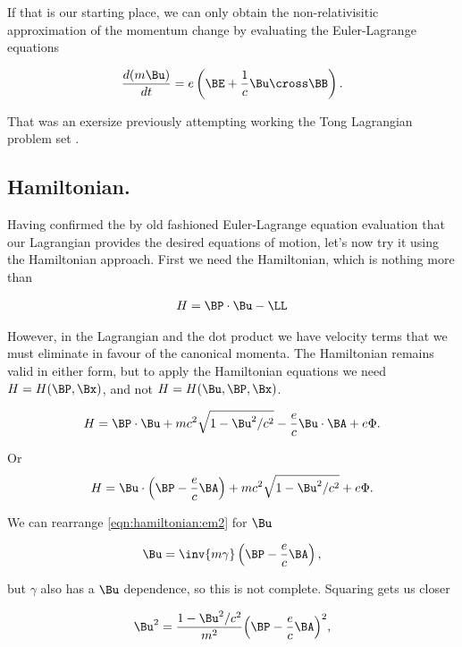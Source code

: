 If that is our starting place, we can only obtain the non-relativisitic approximation of the momentum change by evaluating the Euler-Lagrange equations

\begin{align}\label{eqn:hamiltonian:em5a}
\frac{d (m \Bu)}{dt} = e \left( \BE + \frac{1}{c} \Bu \cross \BB \right).
\end{align}

That was an exersize previously attempting working the Tong Lagrangian problem set \cite{TongMf1}.

\subsection{Hamiltonian.}

Having confirmed the by old fashioned Euler-Lagrange equation evaluation that our Lagrangian provides the desired equations of motion, let's now try it using the Hamiltonian approach.  First we need the Hamiltonian, which is nothing more than

\begin{align}\label{eqn:hamiltonian:em10}
H = \BP \cdot \Bu - \LL
\end{align}

However, in the Lagrangian and the dot product we have velocity terms that we must eliminate in favour of the canonical momenta.  The Hamiltonian remains valid in either form, but to apply the Hamiltonian equations we need $H = H(\BP, \Bx)$, and not $H = H(\Bu, \BP, \Bx)$.

\begin{align}\label{eqn:hamiltonian:em11}
H = \BP \cdot \Bu + m c^2 \sqrt{1 - \Bu^2/c^2} - \frac{e}{c} \Bu \cdot \BA + e \Phi.
\end{align}

Or
\begin{align}\label{eqn:hamiltonian:em11b}
H = \Bu \cdot \left(\BP - \frac{e}{c} \BA\right) + m c^2 \sqrt{1 - \Bu^2/c^2} + e \Phi.
\end{align}

We can rearrange \ref{eqn:hamiltonian:em2} for $\Bu$

\begin{align}\label{eqn:hamiltonian:em12}
\Bu = \inv{m \gamma} \left( \BP - \frac{e}{c} \BA \right),
\end{align}

but $\gamma$ also has a $\Bu$ dependence, so this is not complete.  Squaring gets us closer

\begin{align}\label{eqn:hamiltonian:em13}
\Bu^2 = \frac{1 - \Bu^2/c^2}{m^2} {\left( \BP - \frac{e}{c} \BA \right)}^2,
\end{align}

